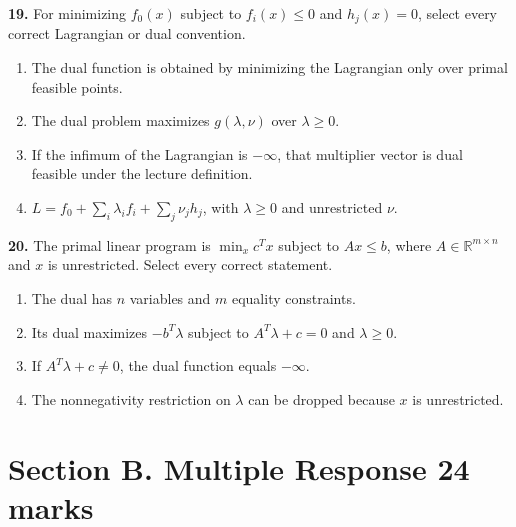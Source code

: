 \documentclass[11pt,a4paper]{article}
\begin{document}
\par\noindent\begin{minipage}{\linewidth}
\textbf{19.} For minimizing \(f_0(x)\) subject to \(f_i(x)\le0\) and \(h_j(x)=0\), select every correct Lagrangian or dual convention.
\begin{enumerate}[label=(\Alph*),leftmargin=8mm,itemsep=2pt,topsep=2pt]
\item The dual function is obtained by minimizing the Lagrangian only over primal feasible points.
\item The dual problem maximizes \(g(\lambda,\nu)\) over \(\lambda\ge0\).
\item If the infimum of the Lagrangian is \(-\infty\), that multiplier vector is dual feasible under the lecture definition.
\item \(L=f_0+\sum_i\lambda_if_i+\sum_j\nu_jh_j\), with \(\lambda\ge0\) and unrestricted \(\nu\).
\end{enumerate}

\end{minipage}\par\vspace{3mm}
\par\noindent\begin{minipage}{\linewidth}
\textbf{20.} The primal linear program is \(\min_x c^Tx\) subject to \(Ax\le b\), where \(A\in\mathbb R^{m\times n}\) and \(x\) is unrestricted. Select every correct statement.
\begin{enumerate}[label=(\Alph*),leftmargin=8mm,itemsep=2pt,topsep=2pt]
\item The dual has \(n\) variables and \(m\) equality constraints.
\item Its dual maximizes \(-b^T\lambda\) subject to \(A^T\lambda+c=0\) and \(\lambda\ge0\).
\item If \(A^T\lambda+c\ne0\), the dual function equals \(-\infty\).
\item The nonnegativity restriction on \(\lambda\) can be dropped because \(x\) is unrestricted.
\end{enumerate}

\end{minipage}\par\vspace{3mm}
\newpage\section*{Section B. Multiple Response \hfill 24 marks}
\end{document}
